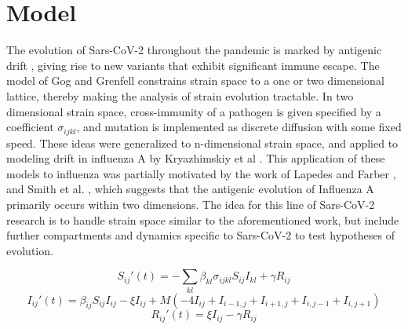 \documentclass{article}
\begin{document}
\section{Model}

The evolution of Sars-CoV-2 throughout the pandemic is marked by antigenic drift \cite{yewdellAntigenicDriftUnderstanding2021}, giving rise to new variants that exhibit significant immune escape. The model of Gog and Grenfell \cite{gogDynamicsSelectionManystrain2002} constrains strain space to a one or two dimensional lattice, thereby making the analysis of strain evolution tractable. In two dimensional strain space, cross-immunity of a pathogen is given specified by a coefficient $\sigma_{ijkl}$, and mutation is implemented as discrete diffusion with some fixed speed. These ideas were generalized to n-dimensional strain space, and applied to modeling drift in influenza A by Kryazhimskiy et al \cite{kryazhimskiyStateSpaceReductionMultiStrain2007}. This application of these models to influenza was partially motivated by the work of Lapedes and Farber \cite{lapedesGeometryShapeSpace2001}, and Smith et al. \cite{smithMappingAntigenicGenetic2004}, which suggests that the antigenic evolution of Influenza A primarily occurs within two dimensions.
The idea for this line of Sars-CoV-2 research is to handle strain space similar to the aforementioned work, but include further compartments and dynamics specific to Sars-CoV-2 to test hypotheses of evolution. 


\begin{equation}
    S_{ij}'(t) = -\sum_{kl} \beta_{kl} \sigma_{ijkl} S_{ij} I_{kl} + \gamma R_{ij}  \label{Seqn}
\end{equation}
\begin{equation}
    I_{ij}'(t) = \beta_{ij} S_{ij} I_{ij} - \xi I_{ij} + M \left(- 4I_{ij} + I_{i-1,j}  + I_{i+1,j} + I_{i,j-1} + I_{i,j+1} \right) \label{Ieqn}    
\end{equation}
\begin{equation}
    R_{ij}'(t) = \xi I_{ij} - \gamma R_{ij}  \label{Reqn}
\end{equation}
\end{document}
